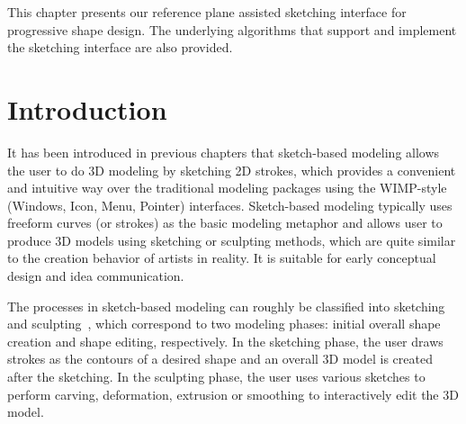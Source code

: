 This chapter presents our reference plane assisted sketching
interface for progressive shape design. The underlying algorithms
that support and implement the sketching interface are also
provided.

\section{Introduction}
\label{ch3:sec:intro}


It has been introduced in previous chapters that sketch-based
modeling allows the user to do 3D modeling by sketching 2D strokes,
which provides a convenient and intuitive way over the traditional
modeling packages using the WIMP-style (Windows, Icon, Menu,
Pointer) interfaces. Sketch-based modeling typically uses freeform
curves (or strokes) as the basic modeling metaphor and allows user
to produce 3D models using sketching or sculpting methods, which are
quite similar to the creation behavior of artists in reality. It is
suitable for early conceptual design and idea communication.


The processes in sketch-based modeling can roughly be classified
into sketching and sculpting~\cite{CIW08}, which correspond to two
modeling phases: initial overall shape creation and shape editing,
respectively. In the sketching phase, the user draws strokes as the
contours of a desired shape and an overall 3D model is created after
the sketching. In the sculpting phase, the user uses various
sketches to perform carving, deformation, extrusion or smoothing to
interactively edit the 3D model.

